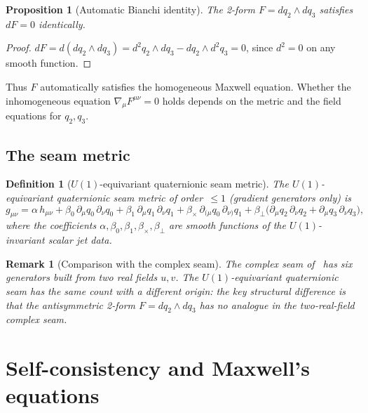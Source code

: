 \documentclass[pdflatex,sn-mathphys-num]{sn-jnl}
\theoremstyle{thmstyleone}%
\newtheorem{proposition}[theorem]{Proposition}
\theoremstyle{thmstyletwo}%
\newtheorem{remark}[theorem]{Remark}
\theoremstyle{thmstylethree}%
\newtheorem{definition}[theorem]{Definition}
\newcommand{\pa}{\partial}
\newcommand{\nn}{\nabla}
\numberwithin{equation}{section}
\begin{document}
\begin{proposition}[Automatic Bianchi identity]
\label{prop:bianchi}
The 2-form $F = dq_2\wedge dq_3$ satisfies $dF = 0$ identically.
\end{proposition}

\begin{proof}
$dF = d(dq_2\wedge dq_3) = d^2q_2\wedge dq_3 - dq_2\wedge d^2q_3
= 0$, since $d^2 = 0$ on any smooth function.
\end{proof}

\noindent
Thus $F$ automatically satisfies the homogeneous Maxwell equation.
Whether the inhomogeneous equation $\nn_\mu F^{\mu\nu} = 0$ holds
depends on the metric and the field equations for $q_2,q_3$.

\subsection{The seam metric}

\begin{definition}[$U(1)$-equivariant quaternionic seam metric]
\label{def:u1-seam-metric}
The $U(1)$-equivariant quaternionic seam metric of order~$\le 1$
(gradient generators only) is
\begin{equation}
\label{eq:u1-seam-metric}
g_{\mu\nu}
= \alpha\,h_{\mu\nu}
  + \beta_0\,\pa_\mu q_0\,\pa_\nu q_0
  + \beta_1\,\pa_\mu q_1\,\pa_\nu q_1
  + \beta_\times\,\pa_{(\mu}q_0\,\pa_{\nu)}q_1
  + \beta_\perp\bigl(
      \pa_\mu q_2\,\pa_\nu q_2 + \pa_\mu q_3\,\pa_\nu q_3
    \bigr),
\end{equation}
where the coefficients $\alpha,\beta_0,\beta_1,\beta_\times,
\beta_\perp$ are smooth functions of the $U(1)$-invariant
scalar jet data.
\end{definition}

\begin{remark}[Comparison with the complex seam]
\label{rem:u1-vs-complex}
The complex seam of~\cite{seam1} has six generators built from
two real fields $u,v$.  The $U(1)$-equivariant quaternionic seam
has the same count with a different origin: the key structural
difference is that the antisymmetric 2-form $F = dq_2\wedge dq_3$
has no analogue in the two-real-field complex seam.
\end{remark}

\section{Self-consistency and Maxwell's equations}
\label{sec:maxwell}
\end{document}
